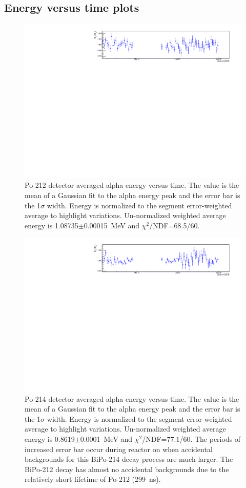 \subsection{Energy versus time plots}
\begin{figure}[!h]
\centering
\includegraphics[width=1.05\textwidth]{figures/PubBiPo212EvsT.pdf}
\caption{\label{fig:EvsT212}Po-212 detector averaged alpha energy versus time. The value is the mean of a Gaussian fit to the alpha energy peak and the error bar is the 1$\sigma$ width. Energy is normalized to the segment error-weighted average to highlight variations. Un-normalized weighted average energy is 1.08735$\pm$0.00015~MeV and $\chi^2$/NDF=68.5/60. }
\end{figure}
\begin{figure}[!h]
\centering
\includegraphics[width=1.05\textwidth]{figures/PubBiPo214EvsT.pdf}
\caption{\label{fig:EvsT214}Po-214 detector averaged alpha energy versus time. The value is the mean of a Gaussian fit to the alpha energy peak and the error bar is the 1$\sigma$ width. Energy is normalized to the segment error-weighted average to highlight variations. Un-normalized weighted average energy is 0.8619$\pm$0.0001~MeV and $\chi^2$/NDF=77.1/60. The periods of increased error bar occur during reactor on when accidental backgrounds for this BiPo-214 decay process are much larger. The BiPo-212 decay has almost no accidental backgrounds due to the relatively short lifetime of Po-212 (299~ns).}
\end{figure}
\newpage
